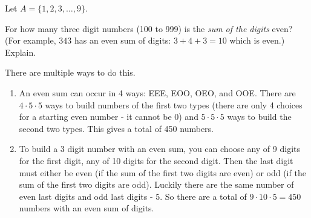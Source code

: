 \documentclass[10pt]{exam}
\begin{document}
\begin{questions}
\question[4] Let $A = \{1,2,3,\ldots,9\}$.  

\question[4] For how many three digit numbers (100 to 999) is the {\em sum of the digits} even? (For example, $343$ has an even sum of digits: $3+4+3 = 10$ which is even.)  Explain.

\begin{solution}
  There are multiple ways to do this.
  \begin{enumerate}
    \item An even sum can occur in 4 ways: EEE, EOO, OEO, and OOE.  There are $4 \cdot 5 \cdot 5$ ways to build numbers of the first two types (there are only 4 choices for a starting even number - it cannot be 0) and $5 \cdot 5 \cdot 5$ ways to build the second two types.  This gives a total of 450 numbers.
    \item To build a 3 digit number with an even sum, you can choose any of 9 digits for the first digit, any of 10 digits for the second digit.  Then the last digit must either be even (if the sum of the first two digits are even) or odd (if the sum of the first two digits are odd).  Luckily there are the same number of even last digits and odd last digits - 5.  So there are a total of $9 \cdot 10 \cdot 5 = 450$ numbers with an even sum of digits.
  \end{enumerate}


\end{solution}
\end{questions}
\end{document}
